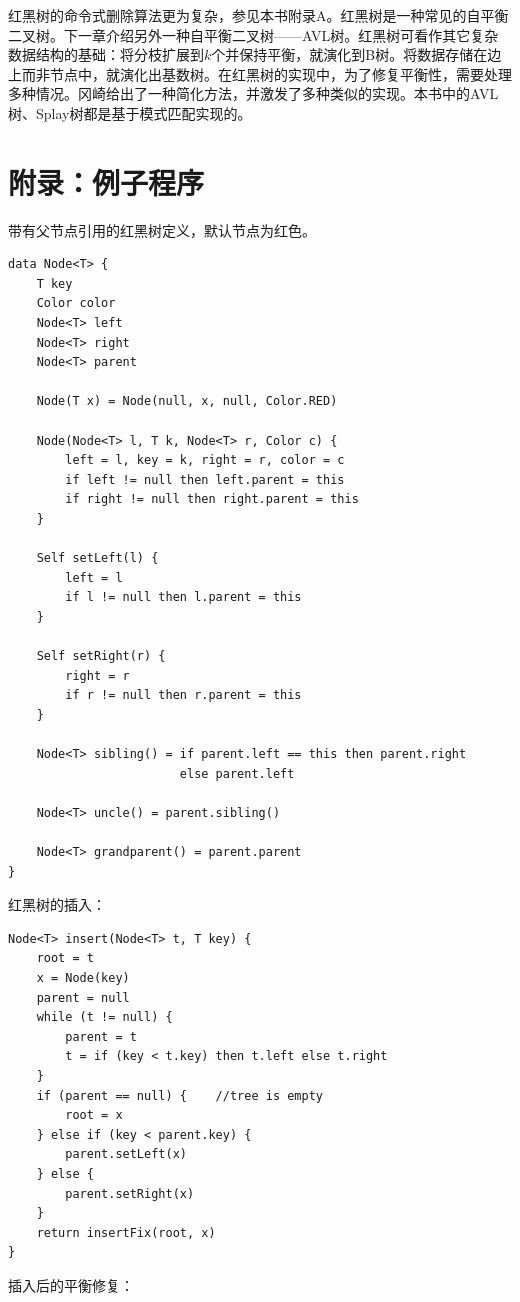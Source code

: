 \documentclass[b5paper]{ctexart}
\begin{document}
红黑树的命令式删除算法更为复杂，参见本书附录A。红黑树是一种常见的自平衡二叉树。下一章介绍另外一种自平衡二叉树——AVL树。红黑树可看作其它复杂数据结构的基础：将分枝扩展到$k$个并保持平衡，就演化到B树。将数据存储在边上而非节点中，就演化出基数树。在红黑树的实现中，为了修复平衡性，需要处理多种情况。冈崎给出了一种简化方法，并激发了多种类似的实现\cite{rosetta}。本书中的AVL树、Splay树都是基于模式匹配实现的。

\section{附录：例子程序}

带有父节点引用的红黑树定义，默认节点为红色。

\begin{lstlisting}[language = Bourbaki]
data Node<T> {
    T key
    Color color
    Node<T> left
    Node<T> right
    Node<T> parent

    Node(T x) = Node(null, x, null, Color.RED)

    Node(Node<T> l, T k, Node<T> r, Color c) {
        left = l, key = k, right = r, color = c
        if left != null then left.parent = this
        if right != null then right.parent = this
    }

    Self setLeft(l) {
        left = l
        if l != null then l.parent = this
    }

    Self setRight(r) {
        right = r
        if r != null then r.parent = this
    }

    Node<T> sibling() = if parent.left == this then parent.right
                        else parent.left

    Node<T> uncle() = parent.sibling()

    Node<T> grandparent() = parent.parent
}
\end{lstlisting}

红黑树的插入：

\begin{lstlisting}[language = Bourbaki]
Node<T> insert(Node<T> t, T key) {
    root = t
    x = Node(key)
    parent = null
    while (t != null) {
        parent = t
        t = if (key < t.key) then t.left else t.right
    }
    if (parent == null) {    //tree is empty
        root = x
    } else if (key < parent.key) {
        parent.setLeft(x)
    } else {
        parent.setRight(x)
    }
    return insertFix(root, x)
}
\end{lstlisting}

插入后的平衡修复：
\end{document}
